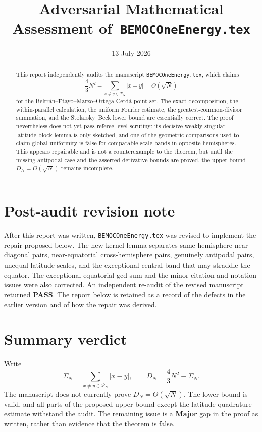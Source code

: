 \documentclass[11pt]{article}
\title{Adversarial Mathematical Assessment of\
\texttt{BEMOCOneEnergy.tex}}
\author{}
\date{13 July 2026}
\newcommand{\major}{\textbf{Major}}
\begin{document}
\maketitle

\begin{abstract}
This report independently audits the manuscript \texttt{BEMOCOneEnergy.tex},
which claims
\[
 \frac43N^2-\sum_{x\ne y\in\mathcal P_N}|x-y|=\Theta(\sqrt N)
\]
for the Beltr\'an--Etayo--Marzo--Ortega-Cerd\`a point set.  The exact
decomposition, the within-parallel calculation, the uniform Fourier estimate,
the greatest-common-divisor summation, and the Stolarsky--Beck lower bound are
essentially correct.  The proof nevertheless does not yet pass referee-level
scrutiny: its decisive weakly singular latitude-block lemma is only sketched,
and one of the geometric comparisons used to claim global uniformity is false
for comparable-scale bands in opposite hemispheres.  This appears repairable
and is not a counterexample to the theorem, but until the missing antipodal
case and the asserted derivative bounds are proved, the upper bound
$D_N=O(\sqrt N)$ remains incomplete.
\end{abstract}

\section*{Post-audit revision note}

After this report was written, \texttt{BEMOCOneEnergy.tex} was revised to
implement the repair proposed below.  The new kernel lemma separates
same-hemisphere near-diagonal pairs, near-equatorial cross-hemisphere pairs,
genuinely antipodal pairs, unequal latitude scales, and the exceptional
central band that may straddle the equator.  The exceptional equatorial gcd
sum and the minor citation and notation issues were also corrected.  An
independent re-audit of the revised manuscript returned \textbf{PASS}.  The
report below is retained as a record of the defects in the earlier version
and of how the repair was derived.

\section{Summary verdict}

Write
\[
 \Sigma_N=\sum_{x\ne y\in\mathcal P_N}|x-y|,
 \qquad D_N=\frac43N^2-\Sigma_N.
\]
The manuscript does not currently prove $D_N=\Theta(\sqrt N)$.  The lower
bound is valid, and all parts of the proposed upper bound except the latitude
quadrature estimate withstand the audit.  The remaining issue is a
\major{} gap in the proof as written, rather than evidence that the theorem is
false.
\end{document}

